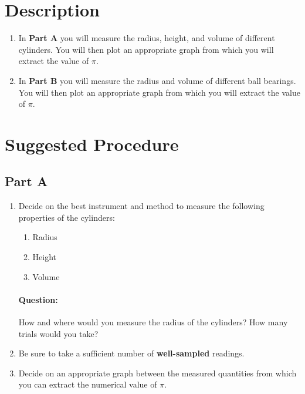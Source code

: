 \section{Description}

\begin{enumerate}
    \item In \textbf{Part A} you will measure the radius, height, and volume of different cylinders. You will then plot an appropriate graph from which you will extract the value of $\pi$.
    
    \item In \textbf{Part B} you will measure the radius and volume of different ball bearings. You will then plot an appropriate graph from which you will extract the value of $\pi$.
    
\end{enumerate}

\section{Suggested Procedure}

\subsection{Part A}

\begin{enumerate}
    \item Decide on the best instrument and method to measure the following properties of the cylinders:
    \begin{enumerate}
        \item Radius
        \item Height
        \item Volume
    \end{enumerate}
    
    \begin{question}
        \paragraph{Question:} How and where would you measure the radius of the cylinders? How many trials would you take?
    \end{question}
    
    \item Be sure to take a sufficient number of \textbf{well-sampled} readings.
    
    \item Decide on an appropriate graph between the measured quantities from which you can extract the numerical value of $\pi$.
\end{enumerate}

